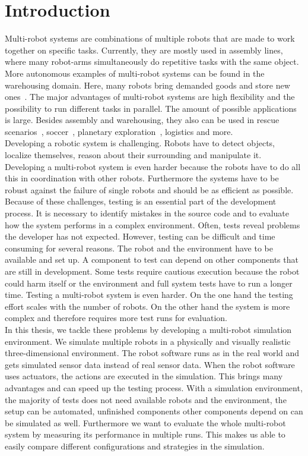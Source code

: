 \chapter{Introduction}

Multi-robot systems are combinations of multiple robots that are made to work together on specific tasks. Currently, they are mostly used in assembly lines, where many robot-arms simultaneously do repetitive tasks with the same object. More autonomous examples of multi-robot systems can be found in the warehousing domain. Here, many robots bring demanded goods and store new ones~\cite{Kiva}. The major advantages of multi-robot systems are high flexibility and the possibility to run different tasks in parallel. The amount of possible applications is large. Besides assembly and warehousing, they also can be used in rescue scenarios~\cite{mas_rescue}, soccer~\cite{mas_soccer}, planetary exploration~\cite{mas_space}, logistics and more.\\
Developing a robotic system is challenging. Robots have to detect objects, localize themselves, reason about their surrounding and manipulate it. Developing a multi-robot system is even harder because the robots have to do all this in coordination with other robots. Furthermore the systems have to be robust against the failure of single robots and should be as efficient as possible. Because of these challenges, testing is an essential part of the development process. It is necessary to identify mistakes in the source code and to evaluate how the system performs in a complex environment. Often, tests reveal problems the developer has not expected. However, testing can be difficult and time consuming for several reasons. The robot and the environment have to be available and set up. A component to test can depend on other components that are still in development. Some tests require cautious execution because the robot could harm itself or the environment and full system tests have to run a longer time. Testing a multi-robot system is even harder. On the one hand the testing effort scales with the number of robots. On the other hand the system is more complex and therefore requires more test runs for evaluation.\\
In this thesis, we tackle these problems by developing a multi-robot simulation environment. We simulate multiple robots in a physically and visually realistic three-dimensional environment. The robot software runs as in the real world and gets simulated sensor data instead of real sensor data. When the robot software uses actuators, the actions are executed in the simulation. This brings many advantages and can speed up the testing process. With a simulation environment, the majority of tests does not need available robots and the environment, the setup can be automated, unfinished components other components depend on can be simulated as well. Furthermore we want to evaluate the whole multi-robot system by measuring its performance in multiple runs. This makes us able to easily compare different configurations and strategies in the simulation.\\
